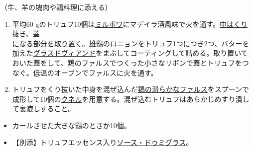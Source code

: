 \begin{recette}


（牛、羊の塊肉や鶏料理に添える）

\begin{enumerate}
\def\labelenumi{\arabic{enumi}.}
\item
  平均60
  gのトリュフ10個は\protect\hyperlink{mirepoix}{ミルポワ}にマデイラ酒風味で火を通す。\ul{中はくり抜き、蓋\\になる部分を取り置く}。雄鶏のロニョンをトリュフ1つにつき2つ、バターを加えた\protect\hyperlink{glace-de-viande}{グラスドヴィアンド}をまぶしてコーティングして詰める。取り置いておいた蓋をして、鶏のファルスでつくった小さなリボンで蓋とトリュフをつなぐ。低温のオーブンでファルスに火を通す。
\item
  トリュフをくり抜いた中身を混ぜ込んだ\protect\hyperlink{farce-c}{鶏の滑らかなファルス}をスプーンで成形して10個の\protect\hyperlink{quenelles-diverses}{クネル}を用意する。混ぜ込むトリュフはあらかじめすり潰して裏漉しすること。
\end{enumerate}

\begin{itemize}
\item
  カールさせた大きな鶏のとさか10個。
\item
  【別添】トリュフエッセンス入り\protect\hyperlink{sauce-demi-glace}{ソース・ドゥミグラス}。
\end{itemize}

\atoaki{}

\hypertarget{garniture-macedoine}{%
}
\end{recette}
